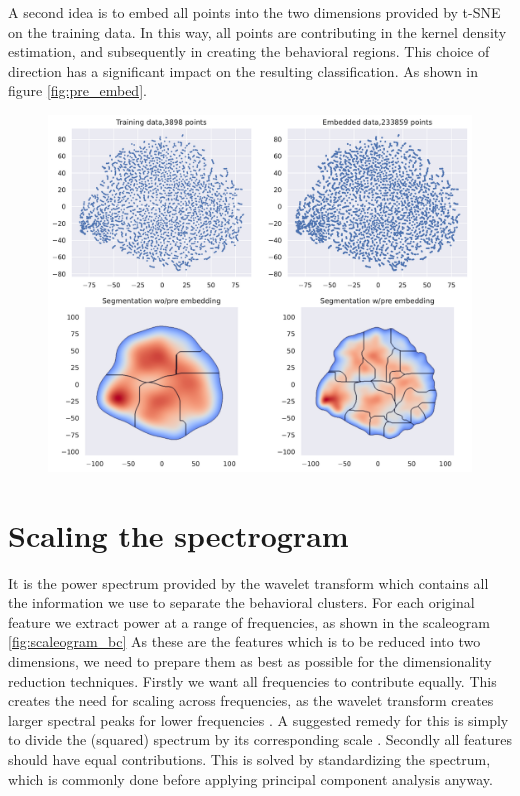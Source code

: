 \documentclass[a4paper, 10pt]{memoir}
\theoremstyle{plain}
\theoremstyle{definition}
\theoremstyle{remark}
\begin{document}
A second idea is to embed all points into the two dimensions provided by t-SNE on the training data. 
In this way, all points are contributing in the kernel density estimation, and subsequently in creating the behavioral regions.
This choice of direction has a significant impact on the resulting classification.
As shown in figure \ref{fig:pre_embed}.
\begin{figure}[tb]
        \centering
        \includegraphics[width=1\linewidth]{./code/figures/test_pre_embed.pdf}
        \caption{}
        \label{fig:test_pre_embed}
\end{figure}

\section{Scaling the spectrogram}
It is the power spectrum provided by the wavelet transform which contains all the information we use to separate the behavioral clusters.
For each original feature we extract power at a range of frequencies, as shown in the scaleogram \ref{fig:scaleogram_bc}
As these are the features which is to be reduced into two dimensions, we need to prepare them as best as possible for the dimensionality reduction techniques.
Firstly we want all frequencies to contribute equally.
This creates the need for scaling across frequencies, as the wavelet transform creates larger spectral peaks for lower frequencies \cite{liu} \cite{berman}.
A suggested remedy for this is simply to divide the (squared) spectrum by its corresponding scale \cite{liu}.
Secondly all features should have equal contributions.
This is solved by standardizing the spectrum, which is commonly done before applying principal component analysis anyway.
\end{document}
